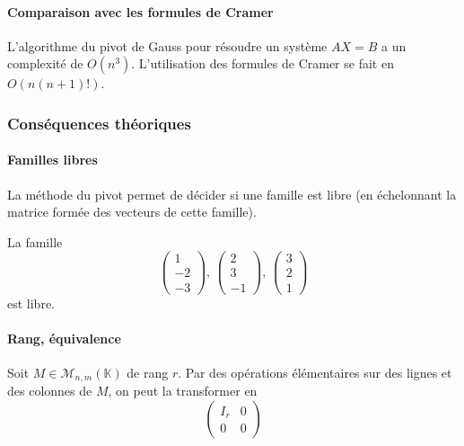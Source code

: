   \paragraph{Comparaison avec les formules de Cramer}
  
  
  \begin{theorem}
    L'algorithme du pivot de Gauss pour résoudre un système $AX = B$ a un complexité de $O(n^3)$. L'utilisation des formules de Cramer se fait en $O(n(n+1)!)$.
  \end{theorem}
  
  \subsubsection{Conséquences théoriques}
  
  \paragraph{Familles libres}
  
  
  \begin{proposition}
    La méthode du pivot permet de décider si une famille est libre (en échelonnant la matrice formée des vecteurs de cette famille).
  \end{proposition}
  
  \begin{example}
    La famille
    \[ \begin{pmatrix} 1 \\ -2 \\ -3 \end{pmatrix}, \, \begin{pmatrix} 2 \\ 3 \\ -1 \end{pmatrix}, \, \begin{pmatrix} 3 \\ 2 \\ 1 \end{pmatrix} \]
    est libre.
  \end{example}
  
  \paragraph{Rang, équivalence}
  
  
  \begin{proposition}
    Soit $M \in \mathcal{M}_{n,m}(\mathbb{K})$ de rang $r$. Par des opérations élémentaires sur des lignes et des colonnes de $M$, on peut la transformer en
    \[
      \begin{pmatrix}
        I_r & 0 \\
        0 & 0
      \end{pmatrix}
    \]
  \end{proposition}
  
